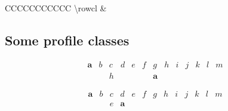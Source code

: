 \documentclass[version=3.21, pagesize, twoside=off, bibliography=totoc, DIV=calc, fontsize=12pt, a4paper]{scrartcl}
\begin{document}
\begin{table}
\begin{tabular}{CCCCCCCCCCC}
{			\FPsub\rowdeltamin{\rowminlPy}{\rowminlPx}%
			\FPsub{}%
			\FPsub{}%
			\FPmul\rowtakendouble{\rowdeltaminminusone}{\rowdeltaminminustwo}%
			\FPdiv{}%
			\FPadd{}%
			\FPsub\rowdeltamax{\rowmaxlPy}{\rowmaxlPx}%
			\FPsub{}%
			\FPadd\rowcltop{\rowstart}{\rowdeltamaxminusone}%
			\num{\rowcl} &
			\FPsub\rowminlPx{\rowmaxlPx}{\rowdlPx}%
			\FPadd\rowsumlPx{\rowminlPx}{\rowmaxlPx}%
			\FPdiv{}%
			\FPsub\rowminlPy{\rowmaxlPy}{\rowdlPy}%
			\FPadd\rowsumlPy{\rowminlPy}{\rowmaxlPy}%
			\FPdiv{}%
		}\\
		\bottomrule
	\end{tabular}
	\caption{Possible values for $m = 13$; $v(z) = (\min \lprof(z), \max \lprof(z), \frac{\sum \lprof(z)}{2})$; top indicates whether $\min \lprof(x) = 0$}
	\label{fig:m13}
\end{table}

\subsection{Some profile classes}
\begin{example}[$\Delta^\text{min} = 2$; $\delta = 1$; $\lprof(x) = (0, 6)$ thus cl $1$]
	\begin{equation}
		\begin{array}{lllllllllllll}
			\bm{a}	& b	& c	& d	& e	& f	& g	& h	& i & j & k & l & m\\
			& & h & & & & \bm{a}
		\end{array} 
	\end{equation}
\end{example}

\begin{example}[$\Delta^\text{min} = 2$; $\delta = 1$; $\lprof(x) = (0, 3)$ thus cl $1$]
	\label{ex:06}
	\begin{equation}
		\begin{array}{lllllllllllll}
			\bm{a}	& b	& c	& d	& e	& f	& g	& h	& i & j & k & l & m\\
			& & e & \bm{a}
		\end{array}
	\end{equation}
\end{example}
\end{document}
